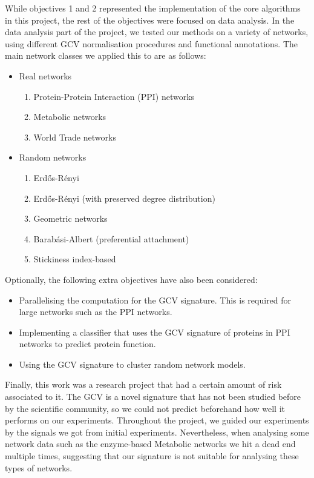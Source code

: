 While objectives 1 and 2 represented the implementation of the core algorithms in this project, the rest of the objectives were focused on data analysis. In the data analysis part of the project, we tested our methods on a variety of networks, using different GCV normalisation procedures and functional annotations. The main network classes we applied this to are as follows:
\begin{itemize}
 \item Real networks
 \begin{enumerate}
    \item Protein-Protein Interaction (PPI) networks
    \item Metabolic networks
    \item World Trade networks
  \end{enumerate}
 \item Random networks
 \begin{enumerate}
    \item Erd\H{o}s-R\'{e}nyi \cite{erdHos1959random}
    \item Erd\H{o}s-R\'{e}nyi (with preserved degree distribution)
    \item Geometric networks \cite{penrose2003random}
    \item Barab\'{a}si-Albert (preferential attachment) \cite{barabasi1999emergence}
    \item Stickiness index-based \cite{prvzulj2006modelling}
  \end{enumerate}
\end{itemize}

Optionally, the following extra objectives have also been considered:
\begin{itemize}
 \item Parallelising the computation for the GCV signature. This is required for large networks such as the PPI networks.
 \item Implementing a classifier that uses the GCV signature of proteins in PPI networks to predict protein function.
 \item Using the GCV signature to cluster random network models.
\end{itemize}

Finally, this work was a research project that had a certain amount of risk associated to it. The GCV is a novel signature that has not been studied before by the scientific community, so we could not predict beforehand how well it performs on our experiments. Throughout the project, we guided our experiments by the signals we got from initial experiments. Nevertheless, when analysing some network data such as the enzyme-based Metabolic networks we hit a dead end multiple times, suggesting that our signature is not suitable for analysing these types of networks. 

